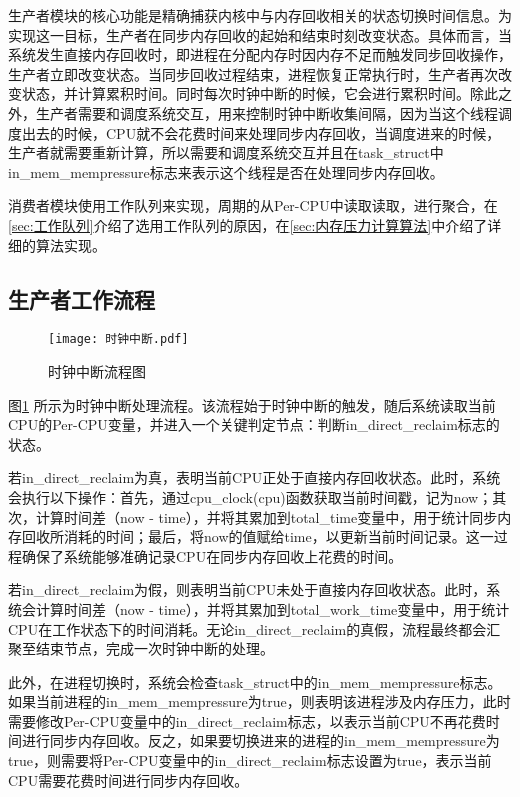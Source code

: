 生产者模块的核心功能是精确捕获内核中与内存回收相关的状态切换时间信息。为实现这一目标，生产者在同步内存回收的起始和结束时刻改变状态。具体而言，当系统发生直接内存回收时，即进程在分配内存时因内存不足而触发同步回收操作，生产者立即改变状态。当同步回收过程结束，进程恢复正常执行时，生产者再次改变状态，并计算累积时间。同时每次时钟中断的时候，它会进行累积时间。除此之外，生产者需要和调度系统交互，用来控制时钟中断收集间隔，因为当这个线程调度出去的时候，CPU就不会花费时间来处理同步内存回收，当调度进来的时候，生产者就需要重新计算，所以需要和调度系统交互并且在task\_struct中in\_mem\_mempressure标志来表示这个线程是否在处理同步内存回收。

消费者模块使用工作队列来实现，周期的从Per-CPU中读取读取，进行聚合，在\ref{sec:工作队列}介绍了选用工作队列的原因，在\ref{sec:内存压力计算算法}中介绍了详细的算法实现。


\subsection{生产者工作流程}

\begin{figure}[htb]
    \centering
    \texttt{[image: 时钟中断.pdf]}
    \caption{时钟中断流程图}
    \label{fig:time-ticker}
\end{figure}
图\ref{fig:time-ticker} 所示为时钟中断处理流程。该流程始于时钟中断的触发，随后系统读取当前CPU的Per-CPU变量，并进入一个关键判定节点：判断in\_direct\_reclaim标志的状态。

若in\_direct\_reclaim为真，表明当前CPU正处于直接内存回收状态。此时，系统会执行以下操作：首先，通过cpu\_clock(cpu)函数获取当前时间戳，记为now；其次，计算时间差（now - time），并将其累加到total\_time变量中，用于统计同步内存回收所消耗的时间；最后，将now的值赋给time，以更新当前时间记录。这一过程确保了系统能够准确记录CPU在同步内存回收上花费的时间。

若in\_direct\_reclaim为假，则表明当前CPU未处于直接内存回收状态。此时，系统会计算时间差（now - time），并将其累加到total\_work\_time变量中，用于统计CPU在工作状态下的时间消耗。无论in\_direct\_reclaim的真假，流程最终都会汇聚至结束节点，完成一次时钟中断的处理。

此外，在进程切换时，系统会检查task\_struct中的in\_mem\_mempressure标志。如果当前进程的in\_mem\_mempressure为true，则表明该进程涉及内存压力，此时需要修改Per-CPU变量中的in\_direct\_reclaim标志，以表示当前CPU不再花费时间进行同步内存回收。反之，如果要切换进来的进程的in\_mem\_mempressure为true，则需要将Per-CPU变量中的in\_direct\_reclaim标志设置为true，表示当前CPU需要花费时间进行同步内存回收。

